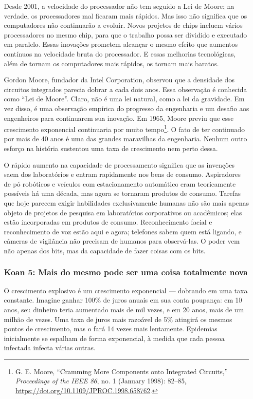Desde 2001, a velocidade do processador não tem seguido a Lei de Moore; na 
verdade, os processadores mal ficaram mais rápidos. Mas isso não significa que
os computadores não continuarão a evoluir. Novos projetos de chips
incluem vários processadores no mesmo chip, para que o trabalho possa ser
dividido e executado em paralelo. Essas inovações prometem alcançar o mesmo
efeito que aumentos contínuos na velocidade bruta do processador. E essas
melhorias tecnológicas, além de tornam os computadores mais rápidos, os
tornam mais baratos.

\begin{tcolorbox}[title={Lei de Moore}]
\label{qd:moore}
Gordon Moore, fundador da Intel Corporation, observou que a densidade dos 
circuitos integrados parecia dobrar a cada dois anos. Essa observação é 
conhecida como ``Lei de Moore''. Claro, não é uma lei natural, como a lei da
gravidade. Em vez disso, é uma observação empírica do progresso da engenharia e 
um desafio aos engenheiros para continuarem sua inovação. Em 1965, Moore previu 
que esse crescimento exponencial continuaria por muito tempo\footnote{G. E.
Moore, ``Cramming More Components onto Integrated Circuits,'' \textit{Proceedings
of the IEEE 86}, no. 1 (January 1998): 82--85, \url{https://doi.org/10.1109/JPROC.1998.658762}.}.
O fato de ter continuado por mais de 40 anos é uma das grandes maravilhas da
engenharia. Nenhum outro esforço na história sustentou uma taxa de crescimento
nem perto dessa.
\end{tcolorbox}

O rápido aumento na capacidade de processamento significa que as invenções saem 
dos laboratórios e entram rapidamente nos bens de consumo. Aspiradores de pó 
robóticos e veículos com estacionamento automático eram teoricamente possíveis 
há uma década, mas agora se tornaram produtos de consumo. Tarefas que hoje 
parecem exigir habilidades exclusivamente humanas não são mais apenas objeto de 
projetos de pesquisa em laboratórios corporativos ou acadêmicos; elas estão 
incorporadas em produtos de consumo. Reconhecimento facial e reconhecimento de 
voz estão aqui e agora; telefones sabem quem está ligando, e câmeras de 
vigilância não precisam de humanos para observá-las. O poder vem não apenas dos 
bits, mas da capacidade de fazer coisas com os bits.


\subsubsection*{Koan 5: Mais do mesmo pode ser uma coisa totalmente nova}
\label{cap1:exp-dig-koans:5}
O crescimento explosivo é um crescimento exponencial --- dobrando em uma taxa 
constante. Imagine ganhar 100\% de juros anuais em sua conta poupança: em 10 
anos, seu dinheiro teria aumentado mais de mil vezes, e em 20 anos, mais de um 
milhão de vezes. Uma taxa de juros mais razoável de 5\% atingirá os mesmos 
pontos de crescimento, mas o fará 14 vezes mais lentamente. Epidemias 
inicialmente se espalham de forma exponencial, à medida que cada pessoa 
infectada infecta várias outras.

